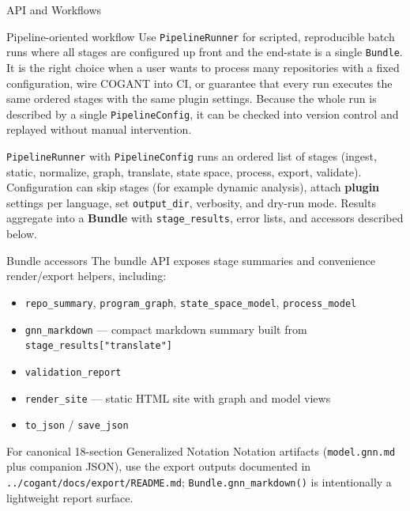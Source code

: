 \documentclass[
  ignorenonframetext,
]{beamer}
\providecommand{\tightlist}{%
  \setlength{\itemsep}{0pt}\setlength{\parskip}{0pt}}
\begin{document}
\begin{frame}[fragile]{API and Workflows}
\begin{block}{Pipeline-oriented workflow}
\protect{}\label{pipeline-oriented-workflow}
Use \texttt{PipelineRunner} for scripted, reproducible batch runs where
all stages are configured up front and the end-state is a single
\texttt{Bundle}. It is the right choice when a user wants to process
many repositories with a fixed configuration, wire COGANT into CI, or
guarantee that every run executes the same ordered stages with the same
plugin settings. Because the whole run is described by a single
\texttt{PipelineConfig}, it can be checked into version control and
replayed without manual intervention.

\texttt{PipelineRunner} with \texttt{PipelineConfig} runs an ordered
list of stages (ingest, static, normalize, graph, translate, state
space, process, export, validate). Configuration can skip stages (for
example dynamic analysis), attach \textbf{plugin} settings per language,
set \texttt{output\_dir}, verbosity, and dry-run mode. Results aggregate
into a \textbf{Bundle} with \texttt{stage\_results}, error lists, and
accessors described below.
\end{block}

\begin{block}{Bundle accessors}
\protect{}\label{bundle-accessors}
The bundle API exposes stage summaries and convenience render/export
helpers, including:

\begin{itemize}
\tightlist
\item
  \texttt{repo\_summary}, \texttt{program\_graph},
  \texttt{state\_space\_model}, \texttt{process\_model}
\item
  \texttt{gnn\_markdown} --- compact markdown summary built from
  \texttt{stage\_results{[}"translate"{]}}
\item
  \texttt{validation\_report}
\item
  \texttt{render\_site} --- static HTML site with graph and model views
\item
  \texttt{to\_json} / \texttt{save\_json}
\end{itemize}

For canonical 18-section Generalized Notation Notation artifacts
(\texttt{model.gnn.md} plus companion JSON), use the export outputs
documented in \texttt{../cogant/docs/export/README.md};
\texttt{Bundle.gnn\_markdown()} is intentionally a lightweight report
surface.
\end{block}


\end{frame}
\end{document}
